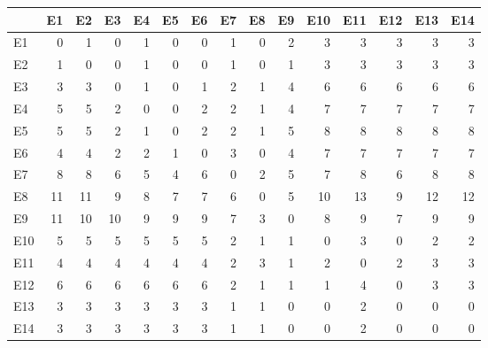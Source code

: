
\begin{tabular}[t]{l|r|r|r|r|r|r|r|r|r|r|r|r|r|r}
\hline
  & E1 & E2 & E3 & E4 & E5 & E6 & E7 & E8 & E9 & E10 & E11 & E12 & E13 & E14\\
\hline
E1 & 0 & 1 & 0 & 1 & 0 & 0 & 1 & 0 & 2 & 3 & 3 & 3 & 3 & 3\\
\hline
E2 & 1 & 0 & 0 & 1 & 0 & 0 & 1 & 0 & 1 & 3 & 3 & 3 & 3 & 3\\
\hline
E3 & 3 & 3 & 0 & 1 & 0 & 1 & 2 & 1 & 4 & 6 & 6 & 6 & 6 & 6\\
\hline
E4 & 5 & 5 & 2 & 0 & 0 & 2 & 2 & 1 & 4 & 7 & 7 & 7 & 7 & 7\\
\hline
E5 & 5 & 5 & 2 & 1 & 0 & 2 & 2 & 1 & 5 & 8 & 8 & 8 & 8 & 8\\
\hline
E6 & 4 & 4 & 2 & 2 & 1 & 0 & 3 & 0 & 4 & 7 & 7 & 7 & 7 & 7\\
\hline
E7 & 8 & 8 & 6 & 5 & 4 & 6 & 0 & 2 & 5 & 7 & 8 & 6 & 8 & 8\\
\hline
E8 & 11 & 11 & 9 & 8 & 7 & 7 & 6 & 0 & 5 & 10 & 13 & 9 & 12 & 12\\
\hline
E9 & 11 & 10 & 10 & 9 & 9 & 9 & 7 & 3 & 0 & 8 & 9 & 7 & 9 & 9\\
\hline
E10 & 5 & 5 & 5 & 5 & 5 & 5 & 2 & 1 & 1 & 0 & 3 & 0 & 2 & 2\\
\hline
E11 & 4 & 4 & 4 & 4 & 4 & 4 & 2 & 3 & 1 & 2 & 0 & 2 & 3 & 3\\
\hline
E12 & 6 & 6 & 6 & 6 & 6 & 6 & 2 & 1 & 1 & 1 & 4 & 0 & 3 & 3\\
\hline
E13 & 3 & 3 & 3 & 3 & 3 & 3 & 1 & 1 & 0 & 0 & 2 & 0 & 0 & 0\\
\hline
E14 & 3 & 3 & 3 & 3 & 3 & 3 & 1 & 1 & 0 & 0 & 2 & 0 & 0 & 0\\
\hline
\end{tabular}
